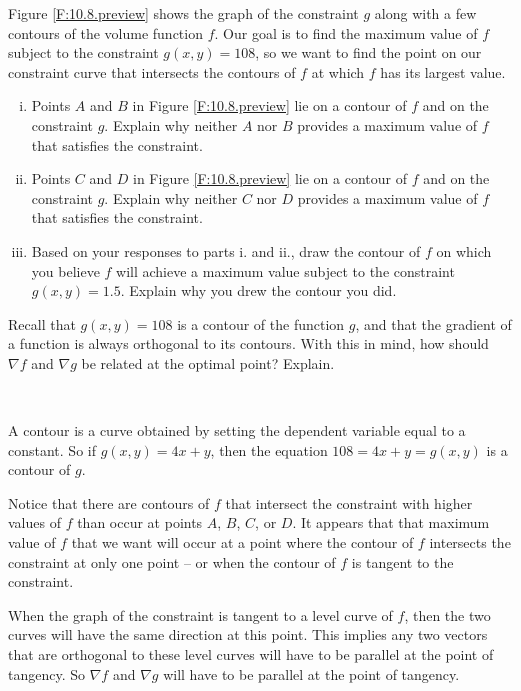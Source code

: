 \begin{pa}
    \item Figure \ref{F:10.8.preview} shows the graph of the constraint $g$ along with a few contours of the volume function $f$. Our goal is to find the maximum value of $f$ subject to the constraint $g(x,y) = 108$, so we want to find the point on our constraint curve that intersects the contours of $f$ at which $f$ has its largest value. 
	\begin{enumerate}[i.]
	\item Points $A$ and $B$ in Figure \ref{F:10.8.preview} lie on a contour of $f$ and on the constraint $g$. Explain why neither $A$ nor $B$ provides a maximum value of $f$ that satisfies the constraint. 
	\item Points $C$ and $D$ in Figure \ref{F:10.8.preview} lie on a contour of $f$ and on the constraint $g$. Explain why neither $C$ nor $D$ provides a maximum value of $f$ that satisfies the constraint. 
	\item Based on your responses to parts i. and ii., draw the contour of $f$ on which you believe $f$ will achieve a maximum value subject to the constraint $g(x,y) = 1.5$. Explain why you drew the contour you did. 
	\end{enumerate}
	

\item Recall that $g(x,y) = 108$ is a contour of the function $g$, and that the gradient of a function is always orthogonal to its contours. With this in mind, how should $\nabla f$ and $\nabla g$ be related at the optimal point? Explain. 


    \ea
\end{pa} 

\begin{activitySolution} ~
    \ba
    \item A contour is a curve obtained by setting the dependent variable equal to a constant. So if $g(x,y) = 4x+y$, then the equation $108 = 4x+y = g(x,y)$ is a contour of $g$.


    \item Notice that there are contours of $f$ that intersect the constraint with higher values of $f$ than occur at points $A$, $B$, $C$, or $D$. It appears that that maximum value of $f$ that we want will occur at a point where the contour of $f$ intersects the constraint at only one point -- or when the contour of $f$ is tangent to the constraint.


\item When the graph of the constraint is tangent to a level curve of $f$, then the two curves will have the same direction at this point. This implies any two vectors that are orthogonal to these level curves will have to be parallel at the point of tangency. So $\nabla f$ and $\nabla g$ will have to be parallel at the point of tangency.


    \ea
\end{activitySolution}
\afterpa 